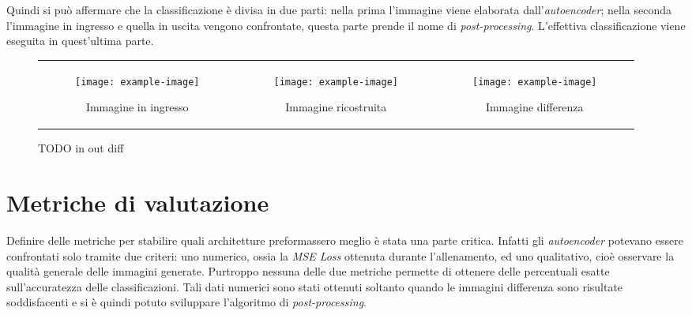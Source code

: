 Quindi si può affermare che la classificazione è divisa in due parti: nella prima l'immagine viene elaborata dall'\textit{autoencoder}; nella seconda l'immagine in ingresso e quella in uscita vengono confrontate, questa parte prende il nome di \textit{post-processing}.
L'effettiva classificazione viene eseguita in quest'ultima parte.

\begin{figure}[ht] %
  \begin{center}
    \begin{tabular}{ccc}

      \begin{subfigure}{.3\linewidth}
        \centering\texttt{[image: example-image]}
        \caption{Immagine in ingresso}
        \label{fig:obbiettivo_in}
      \end{subfigure} &

      \begin{subfigure}{.3\linewidth}
        \centering\texttt{[image: example-image]}
        \caption{Immagine ricostruita}
        \label{fig:obbiettivo_out}
      \end{subfigure} &

      \begin{subfigure}{.3\linewidth}
        \centering\texttt{[image: example-image]}
        \caption{Immagine differenza}
        \label{fig:obbiettivo_diff}
      \end{subfigure}

    \end{tabular}
    \caption{TODO in out diff}
    \label{fig:obbiettivo_in_out_diff}
  \end{center}
\end{figure}

\clearpage
\section{Metriche di valutazione}
Definire delle metriche per stabilire quali architetture preformassero meglio è stata una parte critica.
Infatti gli \textit{autoencoder} potevano essere confrontati solo tramite due criteri: uno numerico, ossia la \textit{MSE Loss} ottenuta durante l'allenamento, ed uno qualitativo, cioè osservare la qualità generale delle immagini generate.
Purtroppo nessuna delle due metriche permette di ottenere delle percentuali esatte sull'accuratezza delle classificazioni.
Tali dati numerici sono stati ottenuti soltanto quando le immagini differenza sono risultate soddisfacenti e si è quindi potuto sviluppare l'algoritmo di \textit{post-processing}.


